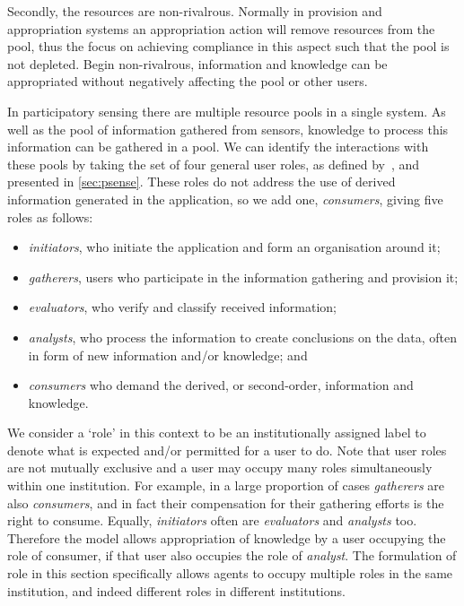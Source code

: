Secondly, the resources are non-rivalrous. Normally in provision and
appropriation systems an appropriation action will remove resources from the
pool, thus the focus on achieving compliance in this aspect such that the pool
is not depleted. Begin non-rivalrous, information and knowledge can be
appropriated without negatively affecting the pool or other users.

In participatory sensing there are multiple resource pools in a single system.
As well as the pool of information gathered from sensors, knowledge to process
this information can be gathered in a pool. We can identify the interactions
with these pools by taking the set of four general user roles, as defined
by~, and presented in \autoref{sec:psense}. These roles
do not address the use of derived information generated in the application, so
we add one, \emph{consumers}, giving five roles as follows:

\begin{itemize}
\item \emph{initiators}, who initiate the application and form an organisation around it;
\item  \emph{gatherers}, users who participate in the information gathering and provision it; 
\item \emph{evaluators}, who verify and classify received information; 
\item \emph{analysts}, who process the information to create conclusions on the data, often in form of new information and/or knowledge; and
\item \emph{consumers} who demand the derived, or second-order, information and knowledge. 
\end{itemize}
We consider a `role' in this context to be an institutionally assigned label to denote what is expected and/or permitted for a user to do. 
Note that user roles are not mutually exclusive and a user may occupy many roles simultaneously within one institution. For example,
in a large proportion of cases \emph{gatherers} are also \emph{consumers}, and in fact their compensation for their gathering efforts is the right to consume. Equally, \emph{initiators} often are \emph{evaluators} and \emph{analysts} too. Therefore the model allows
appropriation of knowledge by a user occupying the role of consumer, if that user also occupies the role of \emph{analyst}. The
formulation of role in this section specifically allows agents to occupy multiple roles in the same institution, and indeed different
roles in different institutions.

